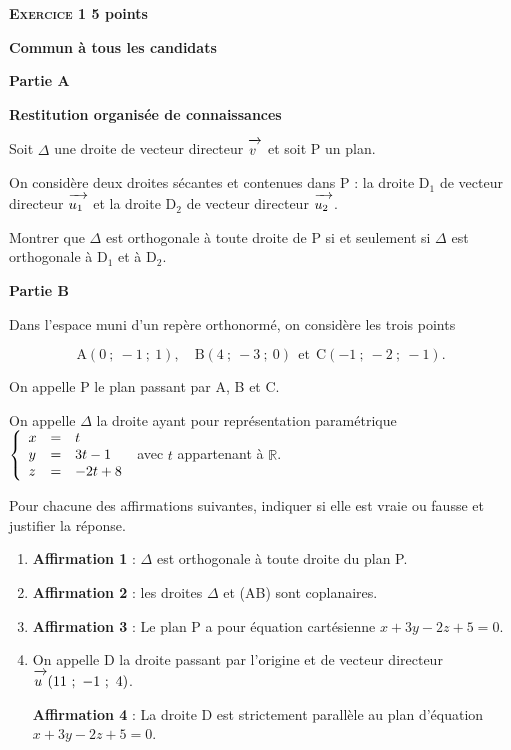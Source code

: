 \documentclass[10pt]{article}
\newcommand{\R}{\mathbb{R}}
\newcommand{\vect}[1]{\mathchoice%
{\overrightarrow{\displaystyle\mathstrut#1\,\,}}%
{\overrightarrow{\textstyle\mathstrut#1\,\,}}%
{\overrightarrow{\scriptstyle\mathstrut#1\,\,}}%
{\overrightarrow{\scriptscriptstyle\mathstrut#1\,\,}}}
\begin{document}
\vspace{0,225cm}

\textbf{\textsc{Exercice 1} \hfill 5 points}
 
\textbf{Commun à tous les candidats}

\medskip

\textbf{Partie A}

\medskip
 
\textbf{Restitution organisée de connaissances}

\medskip
 
Soit $\Delta$ une droite de vecteur directeur $\vect{v}$ et soit P un plan.
 
On considère deux droites sécantes et contenues dans P : la droite D$_{1}$ de vecteur directeur $\vect{u_{1}}$ et la droite D$_{2}$ de vecteur directeur $\vect{u_{2}}$.
 
Montrer que $\Delta$ est orthogonale à toute droite de P si et seulement si $\Delta$ est orthogonale à D$_{1}$ et à D$_{2}$.

\bigskip

 
\textbf{Partie B}

\medskip
 
Dans l'espace muni d'un repère orthonormé, on considère les trois points 

\[\text{A}(0~;~- 1~;~1),\quad  \text{B}(4~;~-3~;~0)\:\: \text{et}\:\: \text{C}(- 1~;~-2~;~-1).\]
 
On appelle P le plan passant par A, B et C.
 
 
On appelle $\Delta$ la droite ayant pour représentation paramétrique  $\left\{\begin{array}{l c l}
x &=& t\\y &=& 3t - 1\\z &=& -2t + 8
\end{array}\right.$ avec $t$ appartenant à $\R$.
  
Pour chacune des affirmations suivantes, indiquer si elle est vraie ou fausse et justifier la réponse.

\medskip
 
\begin{enumerate}
\item \textbf{Affirmation 1} : $\Delta$ est orthogonale à toute droite du plan P. 
\item \textbf{Affirmation 2} : les droites $\Delta$ et (AB) sont coplanaires. 
\item \textbf{Affirmation 3} : Le plan P a pour équation cartésienne $x + 3y - 2z + 5 = 0$. 
\item On appelle D la droite passant par l'origine et de vecteur directeur $\vect{u}(11~;~- 1~;~4)$.
 
\textbf{Affirmation 4} : La droite D est strictement parallèle au plan d'équation $x + 3y - 2z + 5 = 0$. 
\end{enumerate}
\end{document}

